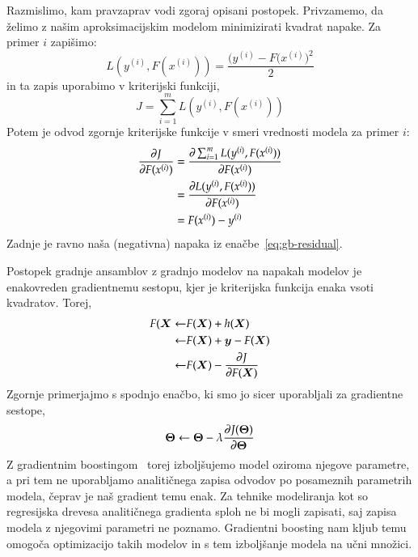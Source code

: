 Razmislimo, kam pravzaprav vodi zgoraj opisani postopek. Privzamemo, da želimo z našim aproksimacijskim modelom minimizirati kvadrat napake. Za primer $i$ zapišimo:
\begin{equation}
  \nonumber
  L(y^{(i)},F(x^{(i)}))=\frac{\big(y^{(i)}-F(x^{(i)}\big)^2}{2}
\end{equation}
in ta zapis uporabimo v kriterijski funkciji,
\begin{equation}
  \nonumber
  J = \sum_{i=1}^m L(y^{(i)},F(x^{(i)}))
\end{equation}
Potem je odvod zgornje kriterijske funkcije v smeri vrednosti modela za primer $i$:
\begin{equation}
  \nonumber
  \begin{split}
    \frac{\partial J}{\partial F(x^{(i)})} & = \frac{\partial\sum_{i=1}^m L(y^{(i)},F(x^{(i)}))}{\partial F(x^{(i)})} \\
    & = \frac{\partial L(y^{(i)},F(x^{(i)}))}{\partial F(x^{(i)})} \\
    & = F(x^{(i)})-y^{(i)}
  \end{split}
\end{equation}
Zadnje je ravno naša (negativna) napaka iz enačbe~\ref{eq:gb-residual}.

Postopek gradnje ansamblov z gradnjo modelov na napakah modelov je enakovreden gradientnemu sestopu, kjer je kriterijska funkcija enaka vsoti kvadratov. Torej,
\begin{equation}
  \nonumber
  \begin{split}
    F({\bm X} \leftarrow & F({\bm X}) + h({\bm X}) \\
    \leftarrow & F({\bm X}) + {\bm y} - F({\bm X}) \\
    \leftarrow & F({\bm X}) - \frac{\partial J}{\partial F({\bm X})}
  \end{split}
\end{equation}
Zgornje primerjajmo s spodnjo enačbo, ki smo jo sicer uporabljali za gradientne sestope,
\begin{equation}
  \nonumber
  {\bm\Theta} \leftarrow {\bm\Theta}-\lambda\frac{\partial J({\bm\Theta})}{\partial\bm\Theta}
\end{equation}
Z gradientnim boostingom~\cite{Friedman2001} torej izboljšujemo model oziroma njegove parametre, a pri tem ne uporabljamo analitičnega zapisa odvodov po posameznih parametrih modela, čeprav je naš gradient temu enak. Za tehnike modeliranja kot so regresijska drevesa analitičnega gradienta sploh ne bi mogli zapisati, saj zapisa modela z njegovimi parametri ne poznamo. Gradientni boosting nam kljub temu omogoča optimizacijo takih modelov in s tem izboljšanje modela na učni množici.

